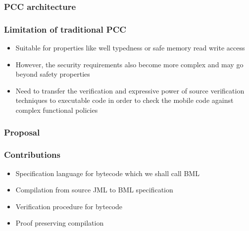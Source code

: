 \documentclass{beamer}
\begin{document}
\begin{frame}
\frametitle{PCC architecture}
\begin{figure}[hc]
\begin{center}
\end{center}
\end{figure}
\end{frame}

\begin{frame}
\frametitle{Limitation of traditional PCC}
\begin{itemize}
 \item Suitable for properties like
       well typedness or safe memory read write access 
 \item However,%
       the security requirements also become more complex and 
       may go beyond safety properties 
            
  \item  Need to transfer the verification and expressive power of source verification techniques
        to executable code  in order to check the mobile code against complex functional policies 

\end{itemize}
\end{frame}


\begin{frame}\frametitle{Proposal}
\begin{center}
\end{center}
\end{frame}


\begin{frame}\frametitle{Contributions}   
  \begin{itemize}
     \item Specification language for bytecode which we shall call BML
     \item Compilation from source JML to BML specification
     \item Verification procedure for bytecode 
     \item Proof preserving compilation
\end{itemize}
\end{frame} 
\end{document}
